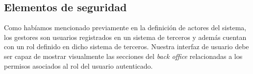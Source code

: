 


\subsection{Elementos de seguridad}

Como habíamos mencionado previamente en la definición de actores del sistema, los gestores son usuarios registrados en un sistema de terceros y además cuentan con un rol definido en dicho sistema de terceros. Nuestra interfaz de usuario debe ser capaz de mostrar visualmente las secciones del \textit{back office} relacionadas a los permisos asociados al rol del usuario autenticado.

